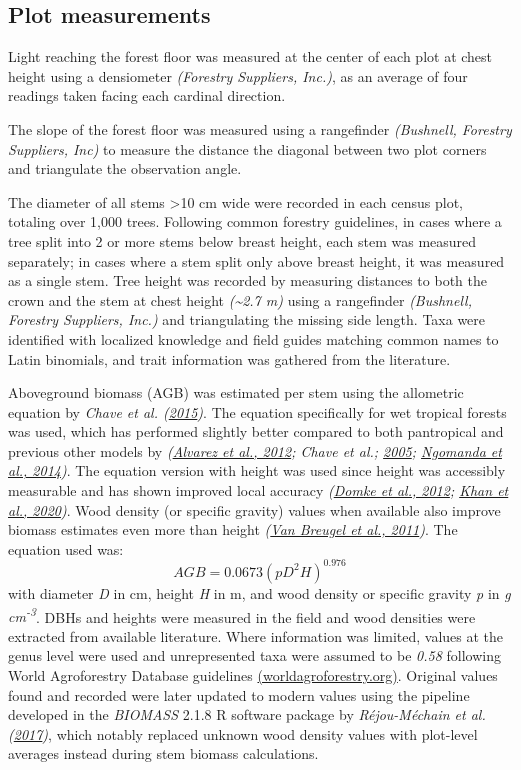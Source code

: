 \documentclass[
  12pt,
]{article}
\begin{document}
\hypertarget{plot-measurements}{%
\subsection{Plot measurements}\label{plot-measurements}}

Light reaching the forest floor was measured at the center of each plot at chest height using a densiometer \emph{(Forestry Suppliers, Inc.)}, as an average of four readings taken facing each cardinal direction.

The slope of the forest floor was measured using a rangefinder \emph{(Bushnell, Forestry Suppliers, Inc)} to measure the distance the diagonal between two plot corners and triangulate the observation angle.

The diameter of all stems \textgreater10 cm wide were recorded in each census plot, totaling over 1,000 trees.
Following common forestry guidelines, in cases where a tree split into 2 or more stems below breast height, each stem was measured separately; in cases where a stem split only above breast height, it was measured as a single stem.
Tree height was recorded by measuring distances to both the crown and the stem at chest height \emph{(\textasciitilde2.7 m)} using a rangefinder \emph{(Bushnell, Forestry Suppliers, Inc.)} and triangulating the missing side length.
Taxa were identified with localized knowledge and field guides matching common names to Latin binomials,
and trait information was gathered from the literature.

Aboveground biomass (AGB) was estimated per stem using the allometric equation by \emph{Chave et al. (\protect\hyperlink{ref-chave15}{2015})}.
The equation specifically for wet tropical forests was used, which has performed slightly better compared to both pantropical and previous other models by \emph{(\protect\hyperlink{ref-alvarez12}{Alvarez et al., 2012}; Chave et al.; \protect\hyperlink{ref-chave05}{2005}; \protect\hyperlink{ref-ngomanda14}{Ngomanda et al., 2014})}.
The equation version with height was used since height was accessibly measurable and has shown improved local accuracy \emph{(\protect\hyperlink{ref-domke12}{Domke et al., 2012}; \protect\hyperlink{ref-khan20}{Khan et al., 2020})}.
Wood density (or specific gravity) values when available also improve biomass estimates even more than height \emph{(\protect\hyperlink{ref-vanbreugel11}{Van Breugel et al., 2011})}.
The equation used was:
\[{AGB} = 0.0673 (p D^2 H)^{0.976}\]
with diameter \emph{D} in cm, height \emph{H} in m, and wood density or specific gravity \emph{p} in \emph{g cm\textsuperscript{-3}}.
DBHs and heights were measured in the field and wood densities were extracted from available literature.
Where information was limited, values at the genus level were used and unrepresented taxa were assumed to be \emph{0.58} following World Agroforestry Database guidelines \href{worldagroforestry.org}{(worldagroforestry.org)}.
Original values found and recorded were later updated to modern values using the pipeline developed in the \emph{BIOMASS} 2.1.8 R software package by \emph{Réjou-Méchain et al. (\protect\hyperlink{ref-rejou-mechain17}{2017})}, which notably replaced unknown wood density values with plot-level averages instead during stem biomass calculations.
\end{document}
